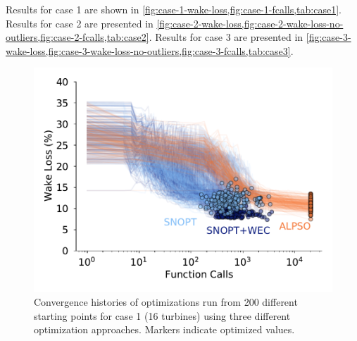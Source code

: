 \documentclass[a4paper]{jpconf}
\begin{document}
Results for case 1 are shown in \cref{fig:case-1-wake-loss,fig:case-1-fcalls,tab:case1}. Results for case 2 are presented in \cref{fig:case-2-wake-loss,fig:case-2-wake-loss-no-outliers,fig:case-2-fcalls,tab:case2}.  Results for case 3 are presented in \cref{fig:case-3-wake-loss,fig:case-3-wake-loss-no-outliers,fig:case-3-fcalls,tab:case3}. 
%
%
\begin{figure}[h]
\centering
\begin{minipage}[t]{.75\textwidth}
\centering
\includegraphics[width=\textwidth]{final_images/results/convergence_history_BPAmodel_16turbs_20dirs}  
\caption{Convergence histories of optimizations run from 200 different starting points for case 1 (16 turbines) using three different optimization approaches. Markers indicate optimized values.}
\label{fig:case-1-histories}
\end{minipage} 
\end{figure}
\end{document}
